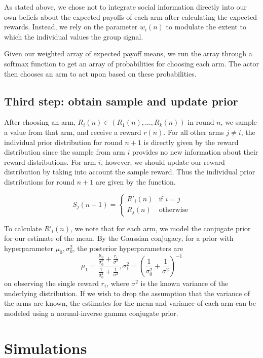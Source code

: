 \documentclass[11pt, a4paper]{article}
\begin{document}
As stated above, we chose not to integrate social information directly into our own beliefs about the expected payoffs of each arm after calculating the expected rewards. Instead, we rely on the parameter $w_i(n)$ to modulate the extent to which the individual values the group signal.

Given our weighted array of expected payoff means, we run the array through a softmax function to get an array of probabilities for choosing each arm. The actor then chooses an arm to act upon based on these probabilities.

\subsection{Third step: obtain sample and update prior}

After choosing an arm, $R_i(n) \in (R_1(n), \ldots, R_k(n))$ in round $n$, we sample a value from that arm, and receive a reward $r(n)$. For all other arms $j \neq i$, the individual prior distribution for round $n+1$ is directly given by the reward distribution since the sample from arm $i$ provides no new information about their reward distributions. For arm $i$, however, we should update our reward distribution by taking into account the sample reward. Thus the individual prior distributions for round $n+1$ are given by the function.

$$
S_j(n+1) = 
\begin{cases}
R'_i(n)	    & \text{if } i = j \\
R_j(n)      & \text{otherwise}
\end{cases}
$$

To calculate $R'_i(n)$, we note that for each arm, we model the conjugate prior for our estimate of the mean. By the Gaussian conjugacy, for a prior with hyperparameter $\mu_0, \sigma_0^2$, the posterior hyperparameters are $$\mu_1 = \frac{\frac{\mu_0}{\sigma_0^2} + \frac{r_i}{\sigma^2}}{\frac{1}{\sigma_0^2} + \frac{1}{\sigma^2}}, \sigma_1^2 = (\frac{1}{\sigma_0^2} + \frac{1}{\sigma^2})^{-1}$$ on observing the single reward $r_i$, where $\sigma^2$ is the known variance of the underlying distribution. If we wish to drop the assumption that the variance of the arms are known, the estimates for the mean and variance of each arm can be modeled using a normal-inverse gamma conjugate prior.

\section{Simulations}
\end{document}
